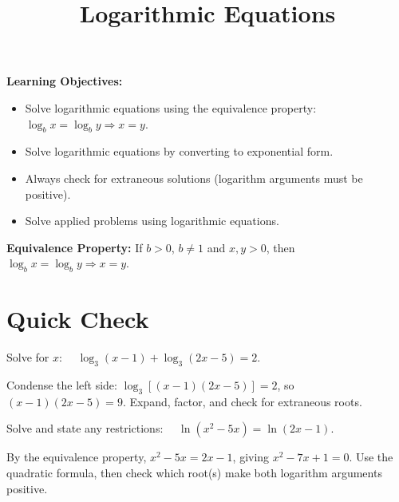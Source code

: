 \documentclass{ximera}
\title{Logarithmic Equations}
\begin{document}
\begin{abstract}
\end{abstract}
\maketitle

\textbf{Learning Objectives:}
\begin{itemize}
  \item Solve logarithmic equations using the equivalence property: $\log_b x = \log_b y \Rightarrow x=y$.
  \item Solve logarithmic equations by converting to exponential form.
  \item Always check for extraneous solutions (logarithm arguments must be positive).
  \item Solve applied problems using logarithmic equations.
\end{itemize}
\medskip

\noindent\textbf{Equivalence Property:} If $b>0$, $b\neq1$ and $x,y>0$, then $\log_b x = \log_b y \Rightarrow x=y$.

\bigskip
\section*{Quick Check}

\begin{problem}
Solve for $x$: $\quad\log_{3}(x-1) + \log_{3}(2x-5) = 2$.
\begin{hint}
Condense the left side: $\log_3[(x-1)(2x-5)]=2$, so $(x-1)(2x-5)=9$. Expand, factor, and check for extraneous roots.
\end{hint}
\begin{multipleChoice}
\end{multipleChoice}
\end{problem}

\begin{problem}
Solve and state any restrictions: $\quad\ln(x^{2}-5x) = \ln(2x-1)$.
\begin{hint}
By the equivalence property, $x^2-5x=2x-1$, giving $x^2-7x+1=0$. Use the quadratic formula, then check which root(s) make both logarithm arguments positive.
\end{hint}
\begin{multipleChoice}
\end{multipleChoice}
\end{problem}
\end{document}
